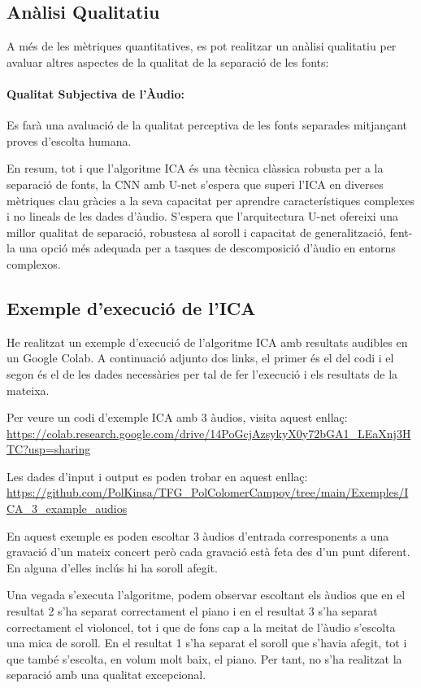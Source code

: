 \documentclass[10pt,a4paper,twocolumn,twoside]{article}
\begin{document}
\subsection{Anàlisi Qualitatiu}

A més de les mètriques quantitatives, es pot realitzar un anàlisi qualitatiu per avaluar altres aspectes de la qualitat de la separació de les fonts:

\paragraph{Qualitat Subjectiva de l'Àudio:} Es farà una avaluació de la qualitat perceptiva de les fonts separades mitjançant proves d'escolta humana. 

En resum, tot i que l'algoritme ICA és una tècnica clàssica robusta per a la separació de fonts, la CNN amb U-net s'espera que superi l'ICA en diverses mètriques clau gràcies a la seva capacitat per aprendre característiques complexes i no lineals de les dades d'àudio. S'espera que l'arquitectura U-net ofereixi una millor qualitat de separació, robustesa al soroll i capacitat de generalització, fent-la una opció més adequada per a tasques de descomposició d'àudio en entorns complexos.

\subsection{Exemple d'execució de l'ICA}

He realitzat un exemple d'execució de l'algoritme ICA amb resultats audibles en un Google Colab. A continuació adjunto dos links, el primer és el del codi i el segon és el de les dades necessàries per tal de fer l'execució i els resultats de la mateixa.

Per veure un codi d'exemple ICA amb 3 àudios, visita aquest enllaç:
\url{https://colab.research.google.com/drive/14PoGcjAzsykyX0y72bGA1_LEaXnj3HTC?usp=sharing}

Les dades d'input i output es poden trobar en aquest enllaç:
\url{https://github.com/PolKinsa/TFG_PolColomerCampoy/tree/main/Exemples/ICA_3_example_audios}

En aquest exemple es poden escoltar 3 àudios d'entrada corresponents a una gravació d'un mateix concert però cada gravació està feta des d'un punt diferent. En alguna d'elles inclús hi ha soroll afegit.

Una vegada s'executa l'algoritme, podem observar escoltant els àudios que en el resultat 2 s'ha separat correctament el piano i en el resultat 3 s'ha separat correctament el violoncel, tot i que de fons cap a la meitat de l'àudio s'escolta una mica de soroll.
En el resultat 1 s'ha separat el soroll que s'havia afegit, tot i que també s'escolta, en volum molt baix, el piano. Per tant, no s'ha realitzat la separació amb una qualitat excepcional.
\end{document}
